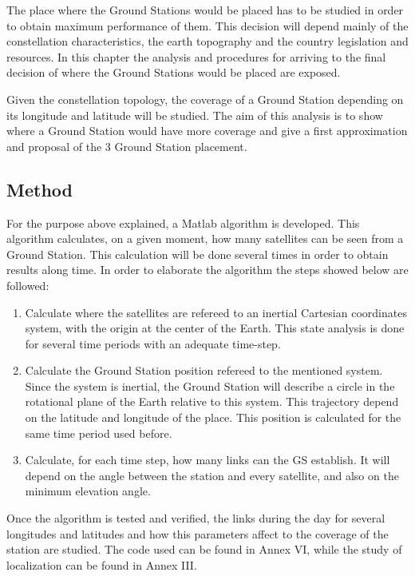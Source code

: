 The place where the Ground Stations would be placed has to be studied in order to obtain maximum performance of them. This decision will depend mainly of the constellation characteristics, the earth topography and the country legislation and resources. In this chapter the analysis and procedures for arriving to the final decision of where the Ground Stations would be placed are exposed.

Given the constellation topology, the coverage of a Ground Station depending on its longitude and latitude will be studied. The aim of this analysis is to show where a Ground Station would have more coverage and give a first approximation and proposal of the 3 Ground Station placement.

\subsection{Method}
For the purpose above explained, a Matlab algorithm is developed. This algorithm calculates, on a given moment, how many satellites can be seen from a Ground Station. This calculation will be done several times in order to obtain results along time. In order to elaborate the algorithm the steps showed below are followed:
\begin{enumerate}
\item Calculate where the satellites are refereed to an inertial Cartesian coordinates system, with the origin at the center of the Earth. This state analysis is done for several time periods with an adequate time-step. 
\item Calculate the Ground Station position refereed to the mentioned system. Since the system is inertial, the Ground Station will describe a circle in the rotational plane of the Earth relative to this system. This trajectory depend on the latitude and longitude of the place. This position is calculated for the same time period used before.
\item Calculate, for each time step, how many links can the GS establish. It will depend on the angle between the station and every satellite, and also on the minimum elevation angle. 
\end{enumerate}

Once the algorithm is tested and verified, the links during the day for several longitudes and latitudes and how this parameters affect to the coverage of the station are studied. The code used can be found in Annex VI, while the study of localization can be found in Annex III.

